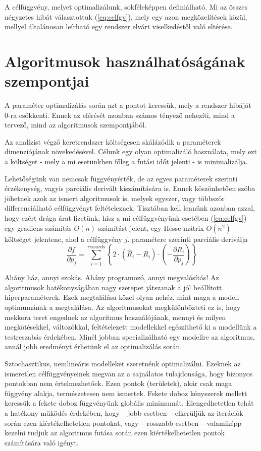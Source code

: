 A célfüggvény, melyet optimalizálunk, sokféleképpen definiálható. Mi az összes négyzetes hibát választottuk (\ref{eq:celfgv}), mely egy azon megközelítések közül, mellyel általánosan leírható egy rendszer elvárt viselkedéstől való eltérése.

\section{Algoritmusok használhatóságának szempontjai}

A paraméter optimalizálás során azt a pontot keressük, mely a rendszer hibáját 0-ra csökkenti. Ennek az elérését azonban számos tényező nehezíti, mind a tervező, mind az algoritmusok szempontjából.

Az analízist végző keretrendszer költségesen skálázódik a paraméterek dimenziójának növekedésével. Célunk egy olyan optimalizáló használata, mely ezt a költséget - mely a mi esetünkben főleg a futási időt jelenti - is minimalizálja.

Lehetőségünk van nemcsak függvényérték, de az egyes paraméterek szerinti érzékenység, vagyis parciális derivált kiszámítására is. Ennek köszönhetően szóba jöhetnek azok az ismert algoritmusok is, melyek egyszer, vagy többször differenciálható célfüggvényt feltételeznek. Tisztában kell lennünk azonban azzal, hogy ezért drága árat fizetünk, hisz a mi célfüggvényünk esetében (\ref{eq:celfgv}) egy gradiens számítás $O(n)$ számítást jelent, egy Hesse-mátrix $O(n^2)$ költséget jelentene, ahol a célfüggvény $j.$ paramétere szerinti parciális deriválja
$$\frac{\partial f}{\partial p_j}=\sum_{i=1}^{rewards}\left\lbrace   2\cdot \left( \hat{R}_i-R_i\right) \cdot\left(-\frac{\partial R_i}{\partial p_j}\right)  \right\rbrace   $$



Ahány ház, annyi szokás. Ahány programozó, annyi megvalósítás! Az algoritmusok hatékonyságában nagy szerepet játszanak a jól beállított hiperparaméterek. Ezek megtalálása közel olyan nehéz, mint maga a modell optimumának a megtalálása. Az algoritmusokat megkülönbözteti ez is, hogy mekkora teret engednek az algoritmus használójának, mennyi és milyen megkötésekkel, változókkal, feltételezett modellekkel egészíthető ki a modellünk a testreszabás érdekében. Minél jobban specializálható egy modellre az algoritmus, annál jobb eredményt érhetünk el az optimalizálás során.

Sztochasztikus, nemlineáris modelleket szeretnénk optimalizálni. Ezeknek az ismeretlen célfüggvényeinek megvan az a sajnálatos tulajdonsága, hogy bizonyos pontokban nem értelmezhetőek. Ezen pontok (területek), akár csak maga függvény alakja, természetesen nem ismertek. Fekete doboz kényszerek mellett keressük a fekete doboz függvényünk globális minimumát. %
Elengedhetetlen tehát a hatékony működés érdekében, hogy -- jobb esetben -- elkerüljük az iterációk során ezen kiértékelhetetlen pontokat, vagy -- rosszabb esetben -- valamiképp kezelni tudjuk az algoritmus futása során ezen kiértékelhetetlen pontok számítására való igényt.

